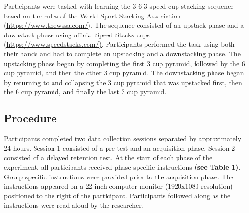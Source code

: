\documentclass[
  english,
  jou]{apa7}
\begin{document}
Participants were tasked with learning the 3-6-3 speed cup stacking sequence based on the rules of the World Sport Stacking Association \href{https://www.thewssa.com/}{(https://www.thewssa.com/)}. The sequence consisted of an upstack phase and a downstack phase using official Speed Stacks cups \href{https://www.speedstacks.com/}{(https://www.speedstacks.com/)}. Participants performed the task using both their hands and had to complete an upstacking and a downstacking phase. The upstacking phase began by completing the first 3 cup pyramid, followed by the 6 cup pyramid, and then the other 3 cup pyramid. The downstacking phase began by returning to and collapsing the 3 cup pyramid that was upstacked first, then the 6 cup pyramid, and finally the last 3 cup pyramid.

\hypertarget{procedure}{%
\subsection{Procedure}\label{procedure}}

Participants completed two data collection sessions separated by approximately 24 hours. Session 1 consisted of a pre-test and an acquisition phase. Session 2 consisted of a delayed retention test. At the start of each phase of the experiment, all participants received phase-specific instructions \textbf{(see Table 1)}. Group specific instructions were provided prior to the acquisition phase. The instructions appeared on a 22-inch computer monitor (1920x1080 resolution) positioned to the right of the participant. Participants followed along as the instructions were read aloud by the researcher.
\end{document}
